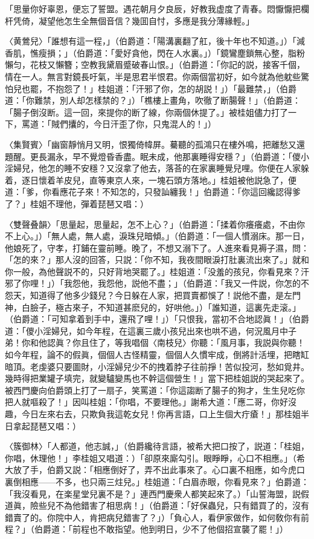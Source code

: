 「思量你好辜恩，便忘了誓盟。遇花朝月夕良辰，好教我虚度了青春。悶懨懨把欄杆凭倚，凝望他怎生全無個音信？幾囬自忖，多應是我分薄緣輕。」

〈黄鶯兒〉「誰想有這一程，」（伯爵道：「陽溝裏翻了舡，後十年也不知道。」）「減香肌，憔瘦損；」（伯爵道：「愛好貪他，閃在人水裏。」）「鏡鸞塵鎖無心整，脂粉懶匀，花枝又懶簪；空教我黛眉蹙破春山恨。」（伯爵道：「你記的説，接客千個，情在一人。無言對鏡長吁氣，半是思君半恨君。你兩個當初好，如今就為他躭些驚怕兒也罷，不抱怨了！」桂姐道：「汗邪了你，怎的胡説！」）「最難禁，」（伯爵道：「你難禁，別人却怎樣禁的？」）「樵樓上畫角，吹徹了断腸聲！」（伯爵道：「腸子倒沒断。這一回，來提你的断了線，你兩個休提了。」被桂姐儘力打了一下，罵道：「賊們攮的，今日汗歪了你，只鬼混人的！」）

〈集賢賓〉「幽窗靜悄月又明，恨獨倚幃屏。驀聽的孤鴻只在樓外鳴，把離愁又還題醒。更長漏永，早不覺燈昏香盡。眠未成，他那裏睡得安穩？」（伯爵道：「儍小淫婦兒，他怎的睡不安穩？又沒拿了他去，落荅的在家裏睡覺兒哩。你便在人家躲着，逐日懷着羊皮兒，直等東京人來，一塊石頭方落地。」桂姐被他説急了，便道：「爹，你看應花子來！不知怎的，只發訕纏我！」伯爵道：「你這回纔認得爹了？」桂姐不理他，彈着琵琶又唱：）

〈雙聲叠韻〉「思量起，思量起，怎不上心？」（伯爵道：「揉着你癢癢處，不由你不上心。」）「無人處，無人處，淚珠兒暗傾。」（伯爵道：「一個人慣溺床。那一日，他娘死了，守孝，打鋪在靈前睡。晚了，不想又溺下了。人進來看見褥子濕，問：「怎的來？」那人沒的回答，只説：「你不知，我夜間眼淚打肚裏流出來了。」就和你一般，為他聲説不的，只好背地哭罷了。」桂姐道：「没羞的孩兒，你看見來？汗邪了你哩！」）「我怨他，我怨他，説他不盡；」（伯爵道：「我又一件説，你怎的不怨天，知道得了他多少錢兒？今日躲在人家，把買賣都悞了！説他不盡，是左門神，白臉子，極古來子，不知道甚麽兒的，好哄他。」）「誰知道，這裏先走滚。」（伯爵道：「可知拿着到手中，還飛了哩！」）「只恨我，當初不合地認眞！」（伯爵道：「儍小淫婦兒，如今年程，在這裏三歲小孩兒出來也哄不過，何況風月中子弟！你和他認眞？你且住了，等我唱個〈南枝兒〉你聽：「風月事，我説與你聽！如今年程，論不的假眞，個個人古怪精靈，個個人久慣牢成，倒將計活埋，把瞎缸暗頂。老虔婆只要圖財，小淫婦兒少不的拽着脖子往前掙！苦似投河，愁如覓井。幾時得把業罐子填完，就變驢變馬也不幹這個營生！」當下把桂姐説的哭起來了。被西門慶向伯爵頭上打了一扇子，笑罵道：「你這謅断了腸子的狗才，生生兒吃你把人就嘔殺了！」因叫桂姐：「你唱，不要理他。」謝希大道：「應二哥，你好沒趣，今日左來右去，只欺負我這乾女兒！你再言語，口上生個大疔瘡！」那桂姐半日拿起琵琶又唱：）

〈簇御林〉「人都道，他志誠，」（伯爵纔待言語，被希大把口按了，説道：「桂姐，你唱，休理他！」李桂姐又唱道：）「卻原來廝勾引。眼睜睜，心口不相應。」（希大放了手，伯爵又説：「相應倒好了，弄不出此事來了。心口裏不相應，如今虎口裏倒相應——不多，也只兩三炷兒。」桂姐道：「白眉赤眼，你看見來？」伯爵道：「我沒看見，在楽星堂兒裏不是？」連西門慶衆人都笑起來了。）「山誓海盟，説假道眞，險些兒不為他錯害了相思病！」（伯爵道：「好保蟲兒，只有錯買了的，沒有錯賣了的。你院中人，肯把病兒錯害了？」）「負心人，看伊家做作，如何敎你有前程？」（伯爵道：「前程也不敢指望。他到明日，少不了他個招宣襲了罷！」）

